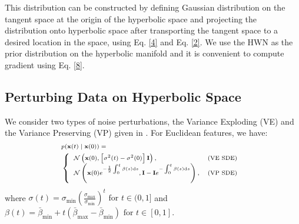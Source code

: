 \documentclass[letterpaper]{article} %
\begin{document}
This distribution can be constructed by defining Gaussian distribution on the tangent space at the origin of the hyperbolic space and projecting the distribution onto hyperbolic space after transporting the tangent space to a desired location in the space, using Eq. \eqref{4} and Eq. \eqref{2}. We use the HWN as the prior distribution on the hyperbolic manifold and it is convenient to compute gradient using Eq. \eqref{8}.

% 
\subsection{Perturbing Data on Hyperbolic Space}
We consider two types of noise perturbations, the Variance Exploding (VE) and the Variance Preserving (VP) given in \cite{song2020score}. For Euclidean features, we have:  
\begin{equation}\label{9}
\begin{scriptsize}{
\begin{aligned}
&p(\mathbf{x}(t) \mid \mathbf{x}(0))=\\ &\left\{\begin{array}{ll}
\mathcal{N}\left(\mathbf{x}(0),\left[\sigma^{2}(t)-\sigma^{2}(0)\right] \mathbf{I}\right), & \text {(VE SDE) } \\
\mathcal{N}\left(\mathbf{x}(0)e^{-\frac{1}{2} \int_{0}^{t} \beta(s) \mathrm{d} s} , \mathbf{I}-\mathbf{I} e^{-\int_{0}^{t} \beta(s) \mathrm{d} s}\right), & (\text{VP SDE)} \\
\end{array}\right.
\end{aligned}
}\end{scriptsize}
\end{equation}
%
where $\sigma(t)=\sigma_{\min }\left(\frac{\sigma_{\max }}{\sigma_{\min }}\right)^{t} \text { for } t \in(0,1]$ and $\beta(t)=\bar{\beta}_{\min }+t\left(\bar{\beta}_{\max }-\bar{\beta}_{\min }\right) \text { for } t \in[0,1]$.
\end{document}
